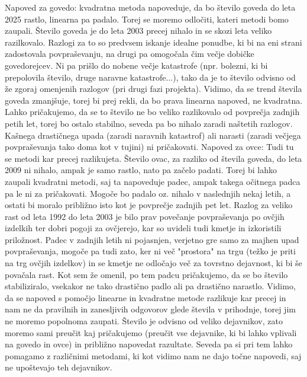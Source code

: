 \documentclass[11pt,a4paper]{article}
\begin{document}
\noindent Napoved za govedo: kvadratna metoda napoveduje, da bo število goveda do leta 2025 rastlo, linearna pa padalo. Torej se moremo odločiti, kateri metodi bomo zaupali. Število goveda je do leta 2003 precej nihalo in se skozi leta veliko razilkovalo. Razlogi za to so predvsem iskanje idealne ponudbe, ki bi na eni strani zadostovala povpraševanju, na drugi pa omogočala čim večje dobičke govedorejcev. Ni pa prišlo do nobene večje katastrofe (npr. bolezni, ki bi prepolovila število, druge naravne katastrofe...), tako da je to število odvisno od že zgoraj omenjenih razlogov (pri drugi fazi projekta). Vidimo, da se trend števila goveda zmanjšuje, torej bi prej rekli, da bo prava linearna napoved, ne kvadratna. Lahko pričakujemo, da se to število ne bo veliko razlikovalo od povprečja zadnjih petih let, torej bo ostalo stabilno, seveda pa bo nihalo zaradi naštetih razlogov. Kašnega drastičnega upada (zaradi naravnih katastrof) ali narasti (zaradi večjega povpraševanja tako doma kot v tujini) ni pričakovati.
\newline
Napoved za ovce: Tudi tu se metodi kar precej razlikujeta. Število ovac, za razliko od števila goveda, do leta 2009 ni nihalo, ampak je samo rastlo, nato pa začelo padati. Torej bi lahko zaupali kvadratni metodi, saj ta napoveduje padec, ampak takega očitnega padca pa le ni za pričakovati. Mogoče bo padalo oz. nihalo v naslednjih nekaj letih, a ostati bi moralo približno isto kot je povprečje zadnjih pet let. Razlog za veliko rast od leta 1992 do leta 2003 je bilo prav povečanje povpraševanja po ovčjih izdelkih ter dobri pogoji za ovčjerejo, kar so uvideli tudi kmetje in izkoristili priložnost. Padec v zadnjih letih ni pojasnjen, verjetno gre samo za majhen upad povpraševanja, mogoče pa tudi zato, ker ni več "prostora" na trgu (težko je priti na trg ovčjih izdelkov) in se kmetje ne odločajo več za tovrstno dejavnost, ki bi še povačala rast. Kot sem že omenil, po tem padcu pričakujemo, da se bo število stabiliziralo, vsekakor ne tako drastično padlo ali pa drastično narastlo.
\newline
Vidimo, da se napoved s pomočjo linearne in kvadratne metode razlikuje kar precej in nam ne da pravilnih in zanesljivih odgovorov glede števila v prihodnje, torej jim ne moremo popolnoma zaupati. Število je odvisno od veliko dejavnikov, zato moremo sami preučit kaj pričakujemo (preučit vse dejavnike, ki bi lahko vplivali na govedo in ovce) in približno napovedat razultate. Seveda pa si pri tem lahko pomagamo z različnimi metodami, ki kot vidimo nam ne dajo točne napovedi, saj ne upoštevajo teh dejavnikov.
\end{document}
